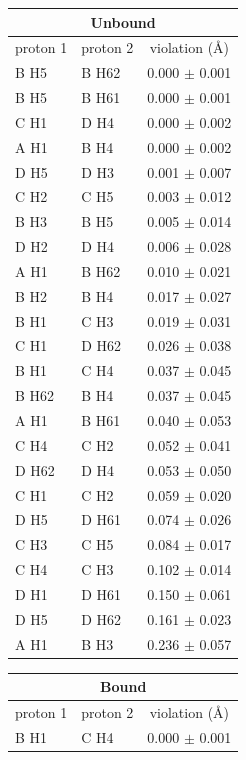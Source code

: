 \begin{table}
\footnotesize
\renewcommand{\arraystretch}{1.3}
\begin{tabular}{llc}
\multicolumn{3}{c}{Unbound} \\
\midrule
proton 1  & proton 2 & violation (\si{\angstrom}) \\
\midrule
B H5 & B H62 & 0.000 $\pm$ 0.001 \\
B H5 & B H61 & 0.000 $\pm$ 0.001 \\
C H1 & D H4 & 0.000 $\pm$ 0.002 \\
A H1 & B H4 & 0.000 $\pm$ 0.002 \\
D H5 & D H3 & 0.001 $\pm$ 0.007 \\
C H2 & C H5 & 0.003 $\pm$ 0.012 \\
B H3 & B H5 & 0.005 $\pm$ 0.014 \\
D H2 & D H4 & 0.006 $\pm$ 0.028 \\
A H1 & B H62 & 0.010 $\pm$ 0.021 \\
B H2 & B H4 & 0.017 $\pm$ 0.027 \\
B H1 & C H3 & 0.019 $\pm$ 0.031 \\
C H1 & D H62 & 0.026 $\pm$ 0.038 \\
B H1 & C H4 & 0.037 $\pm$ 0.045 \\
B H62 & B H4 & 0.037 $\pm$ 0.045 \\
A H1 & B H61 & 0.040 $\pm$ 0.053 \\
C H4 & C H2 & 0.052 $\pm$ 0.041 \\
D H62 & D H4 & 0.053 $\pm$ 0.050 \\
C H1 & C H2 & 0.059 $\pm$ 0.020 \\
D H5 & D H61 & 0.074 $\pm$ 0.026 \\
C H3 & C H5 & 0.084 $\pm$ 0.017 \\
C H4 & C H3 & 0.102 $\pm$ 0.014 \\
D H1 & D H61 & 0.150 $\pm$ 0.061 \\
D H5 & D H62 & 0.161 $\pm$ 0.023 \\
A H1 & B H3 & 0.236 $\pm$ 0.057 \\
\midrule
\end{tabular}
\quad
\begin{tabular}{llc}
\multicolumn{3}{c}{Bound} \\
\midrule
proton 1  & proton 2 & violation (\si{\angstrom}) \\
\midrule
B H1 & C H4 & 0.000 $\pm$ 0.001 \\

\end{tabular}
\end{table}
